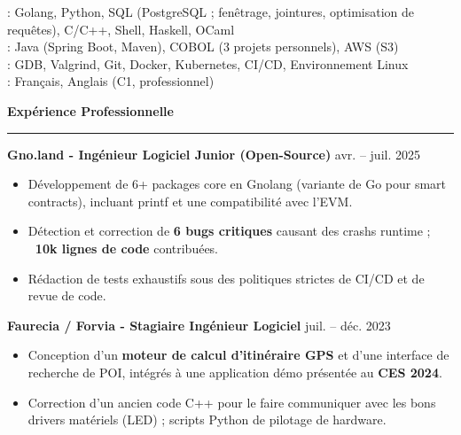 \documentclass[9pt]{extarticle}
\begin{document}
\hspace*{5pt}{\bfseries Maîtrise}: Golang, Python, SQL (PostgreSQL ; fenêtrage, jointures, optimisation de requêtes), C/C++, Shell, Haskell, OCaml
\\
\hspace*{5pt}{\bfseries Pratique}: Java (Spring Boot, Maven), COBOL (3 projets personnels), AWS (S3)
\\
\hspace*{5pt}{\bfseries Outils}: GDB, Valgrind, Git, Docker, Kubernetes, CI/CD, Environnement Linux
\\
\hspace*{5pt}{\bfseries Langues}: Français, Anglais (C1, professionnel)

\par\vspace{5pt}

{\large\bfseries Expérience Professionnelle}
\par\vspace{-8pt}
\rule{\linewidth}{0.4pt}
\par\vspace{5pt}

{\bfseries Gno.land - Ingénieur Logiciel Junior (Open-Source)} \hfill avr. -- juil. 2025
\begin{itemize}[noitemsep, topsep=0pt]
	\item Développement de 6+ packages core en Gnolang (variante de Go pour smart contracts), incluant printf et une compatibilité avec l'EVM.
	\item Détection et correction de {\bfseries 6 bugs critiques} causant des crashs runtime ; {\bfseries ~10k lignes de code} contribuées.
	\item Rédaction de tests exhaustifs sous des politiques strictes de CI/CD et de revue de code.
\end{itemize}

\par\vspace{5pt}

{\bfseries Faurecia / Forvia - Stagiaire Ingénieur Logiciel} \hfill juil. -- déc. 2023
\begin{itemize}[noitemsep, topsep=0pt]
	\item Conception d'un {\bfseries moteur de calcul d'itinéraire GPS} et d'une interface de recherche de POI, intégrés à une application démo présentée au {\bfseries CES 2024}.
	\item Correction d'un ancien code C++ pour le faire communiquer avec les bons drivers matériels (LED) ; scripts Python de pilotage de hardware.
\end{itemize}
\end{document}
